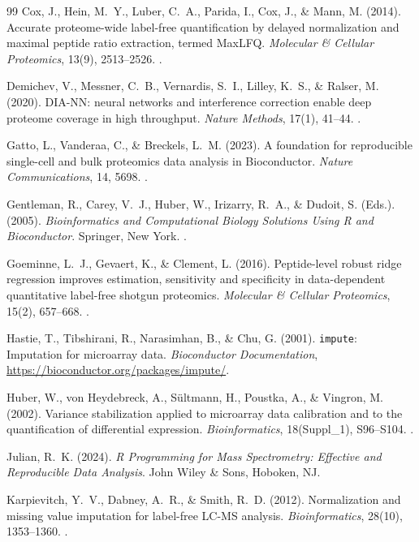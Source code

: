 \documentclass[11pt,oneside]{book}
\begin{document}
\begin{thebibliography}{99}
Cox, J., Hein, M.~Y., Luber, C.~A., Parida, I., Cox, J., \& Mann, M. (2014). Accurate proteome-wide label-free quantification by delayed normalization and maximal peptide ratio extraction, termed MaxLFQ. \textit{Molecular \& Cellular Proteomics}, 13(9), 2513--2526. .

Demichev, V., Messner, C.~B., Vernardis, S.~I., Lilley, K.~S., \& Ralser, M. (2020). DIA-NN: neural networks and interference correction enable deep proteome coverage in high throughput. \textit{Nature Methods}, 17(1), 41--44. .

Gatto, L., Vanderaa, C., \& Breckels, L.~M. (2023). A foundation for reproducible single-cell and bulk proteomics data analysis in Bioconductor. \textit{Nature Communications}, 14, 5698. .

Gentleman, R., Carey, V.~J., Huber, W., Irizarry, R.~A., \& Dudoit, S. (Eds.). (2005). \textit{Bioinformatics and Computational Biology Solutions Using R and Bioconductor}. Springer, New York. .

Goeminne, L.~J., Gevaert, K., \& Clement, L. (2016). Peptide-level robust ridge regression improves estimation, sensitivity and specificity in data-dependent quantitative label-free shotgun proteomics. \textit{Molecular \& Cellular Proteomics}, 15(2), 657--668. .

Hastie, T., Tibshirani, R., Narasimhan, B., \& Chu, G. (2001). \texttt{impute}: Imputation for microarray data. \textit{Bioconductor Documentation}, \url{https://bioconductor.org/packages/impute/}.

Huber, W., von Heydebreck, A., S\"ultmann, H., Poustka, A., \& Vingron, M. (2002). Variance stabilization applied to microarray data calibration and to the quantification of differential expression. \textit{Bioinformatics}, 18(Suppl\_1), S96--S104. .

Julian, R.~K. (2024). \textit{R Programming for Mass Spectrometry: Effective and Reproducible Data Analysis}. John Wiley \& Sons, Hoboken, NJ.

Karpievitch, Y.~V., Dabney, A.~R., \& Smith, R.~D. (2012). Normalization and missing value imputation for label-free LC-MS analysis. \textit{Bioinformatics}, 28(10), 1353--1360. .


\end{thebibliography}
\end{document}

